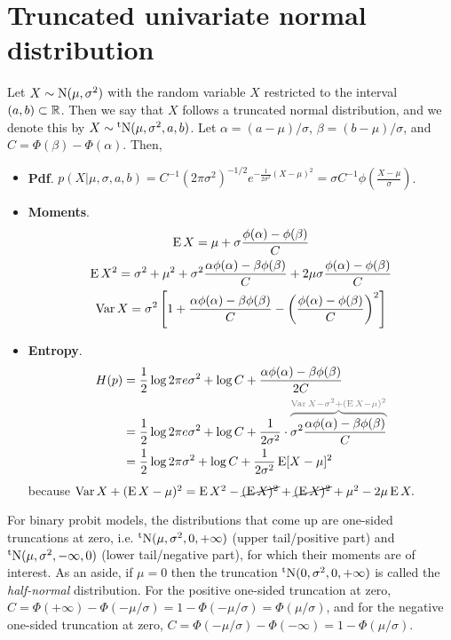 \section{Truncated univariate normal distribution}

Let $X \sim \operatorname{N}(\mu,\sigma^2)$ with the random variable $X$ restricted to the interval $(a,b) \subset \mathbb{R}$.
Then we say that $X$ follows a truncated normal distribution, and we denote this by $X\sim\operatorname{{}^tN}(\mu,\sigma^2,a,b)$.
Let $\alpha = (a-\mu)/\sigma$, $\beta = (b-\mu)/\sigma$, and $C = \Phi(\beta) - \Phi(\alpha)$.
Then,
\begin{itemize}
  \item \textbf{Pdf}. $p(X|\mu,\sigma,a,b) = C^{-1} (2\pi\sigma^2)^{-1/2}e^{-\frac{1}{2\sigma^2} (X-\mu)^2} = \sigma C^{-1} \phi(\frac{X-\mu}{\sigma})$.
  \item \textbf{Moments}. 
  \vspace{-1.2em}
  \begin{gather*}
    \operatorname{E} X = \mu + \sigma \frac{\phi(\alpha) - \phi(\beta)}{C} \\
    \operatorname{E} X^2 = \sigma^2 + \mu^2 + \sigma^2  \frac{\alpha\phi(\alpha) - \beta\phi(\beta)}{C}   + 2\mu\sigma \frac{\phi(\alpha) - \phi(\beta)}{C} \\
    \operatorname{Var} X = \sigma^2 \left[ 1 +  \frac{\alpha\phi(\alpha) - \beta\phi(\beta)}{C} - \left(\frac{\phi(\alpha) - \phi(\beta)}{C}\right)^2 \right]
  \end{gather*}
  \item \textbf{Entropy}.
  \begin{align*}
    H(p) 
    &= \half\log 2\pi e\sigma^2 + \log C + \frac{\alpha\phi(\alpha) - \beta\phi(\beta)}{2C} \\
    &= \half\log 2\pi e\sigma^2 + \log C + \frac{1}{2\sigma^2}\cdot \greyoverbrace{\sigma^2\frac{\alpha\phi(\alpha) - \beta\phi(\beta)}{C}}{\Var X -\sigma^2 + (\E X - \mu)^2} \\
    &= \half\log 2\pi \sigma^2 + \log C + \frac{1}{2\sigma^2}\E [X - \mu]^2 
  \end{align*}
  because $\operatorname{Var} X + (\operatorname{E} X - \mu)^2 = \operatorname{E} X^2 - \cancel{(\operatorname{E} X)^2} + \cancel{(\operatorname{E} X)^2} + \mu^2 - 2\mu\operatorname{E} X.$
\end{itemize}

For binary probit models, the distributions that come up are one-sided truncations at zero, i.e. $\operatorname{{}^tN}(\mu,\sigma^2,0,+\infty)$ (upper tail/positive part) and $\operatorname{{}^tN}(\mu,\sigma^2,-\infty,0)$ (lower tail/negative part), for which their moments are of interest.
As an aside, if $\mu = 0$ then the truncation $\operatorname{{}^tN}(0,\sigma^2,0,+\infty)$ is called the \emph{half-normal} distribution.
For the positive one-sided truncation at zero, $C = \Phi(+\infty) - \Phi(-\mu/\sigma) = 1 - \Phi(-\mu/\sigma) = \Phi(\mu/\sigma)$, and for the negative one-sided truncation at zero, $C = \Phi(-\mu/\sigma) - \Phi(-\infty) = 1 - \Phi(\mu/\sigma)$.

